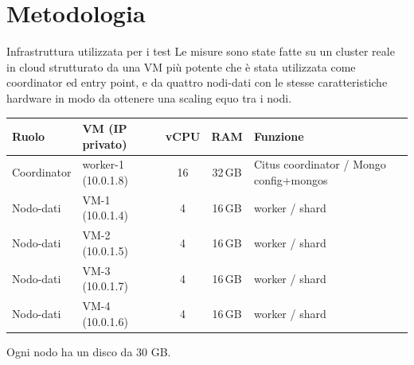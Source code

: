 \documentclass[aspectratio=169,11pt]{beamer}
\begin{document}
\section{Metodologia}
\begin{frame}{Infrastruttura utilizzata per i test}
  \small Le misure sono state fatte su un cluster reale in cloud strutturato da una VM più potente che è stata utilizzata come coordinator ed entry point, e da quattro nodi-dati con le stesse caratteristiche hardware in modo da ottenere una scaling equo tra i nodi.
  \vspace{0.4em}
  \centering
  \footnotesize
  \renewcommand{\arraystretch}{1.3}
  \begin{tabular}{@{}llccl@{}}
    \toprule
    \textbf{Ruolo} & \textbf{VM (IP privato)} & \textbf{vCPU} & \textbf{RAM} & \textbf{Funzione} \\
    \midrule
    Coordinator & worker-1 (10.0.1.8) & 16 & 32\,GB & Citus coordinator / Mongo config+mongos \\
    Nodo-dati   & VM-1 (10.0.1.4)     & 4  & 16\,GB & worker / shard \\
    Nodo-dati   & VM-2 (10.0.1.5)     & 4  & 16\,GB & worker / shard \\
    Nodo-dati   & VM-3 (10.0.1.7)     & 4  & 16\,GB & worker / shard \\
    Nodo-dati   & VM-4 (10.0.1.6)     & 4  & 16\,GB & worker / shard \\
    \bottomrule
  \end{tabular}
  \vspace{0.4em}
  Ogni nodo ha un disco da 30 GB.
\end{frame}
\end{document}
